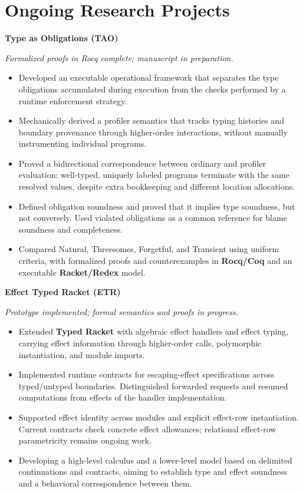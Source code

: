 \documentclass[letterpaper,11pt]{article}
\newenvironment{cvitems}{
  \begin{itemize}[leftmargin=1.2em,itemsep=2pt,topsep=3pt,parsep=0pt,partopsep=0pt]
}{\end{itemize}}
\newcommand{\cvproject}[2]{%
  \Needspace{6\baselineskip}%
  \textbf{#1}\par
  \textit{#2}\par
}
\newcommand{\vsp}{\vspace{6pt}}
\begin{document}
\section{Ongoing Research Projects}
\cvproject{Type as Obligations (TAO)}{Formalized proofs in Rocq complete; manuscript in preparation.}
\begin{cvitems}
  \item Developed an executable operational framework that separates the type obligations accumulated during execution from the checks performed by a runtime enforcement strategy.
  \item Mechanically derived a profiler semantics that tracks typing histories and boundary provenance through higher-order interactions, without manually instrumenting individual programs.
  \item Proved a bidirectional correspondence between ordinary and profiler evaluation: well-typed, uniquely labeled programs terminate with the same resolved values, despite extra bookkeeping and different location allocations.
  \item Defined obligation soundness and proved that it implies type soundness, but not conversely. Used violated obligations as a common reference for blame soundness and completeness.
  \item Compared Natural, Threesomes, Forgetful, and Transient using uniform criteria, with formalized proofs and counterexamples in \textbf{Rocq/Coq} and an executable \textbf{Racket/Redex} model.
\end{cvitems}

\vsp

\cvproject{Effect Typed Racket (ETR)}{Prototype implemented; formal semantics and proofs in progress.}

\begin{cvitems}
  \item Extended \textbf{Typed Racket} with algebraic effect handlers and effect typing, carrying effect information through higher-order calls, polymorphic instantiation, and module imports.
  \item Implemented runtime contracts for escaping-effect specifications across typed/untyped boundaries. Distinguished forwarded requests and resumed computations from effects of the handler implementation.
  \item Supported effect identity across modules and explicit effect-row instantiation. Current contracts check concrete effect allowances; relational effect-row parametricity remains ongoing work.
  \item Developing a high-level calculus and a lower-level model based on delimited continuations and contracts, aiming to establish type and effect soundness and a behavioral correspondence between them.
\end{cvitems}
\end{document}
